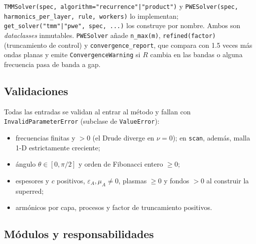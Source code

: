 \documentclass[11pt,a4paper]{article}
\begin{document}
\texttt{TMMSolver(spec, algorithm="recurrence"|"product")} y
\texttt{PWESolver(spec, harmonics\_per\_layer, rule, workers)} lo implementan;
\texttt{get\_solver("tmm"|"pwe", spec, ...)} los construye por nombre. Ambos
son \emph{dataclasses} inmutables. \texttt{PWESolver} añade
\texttt{n\_max(m)}, \texttt{refined(factor)} (truncamiento de control) y
\texttt{convergence\_report}, que compara con 1.5 veces más ondas planas y
emite \texttt{ConvergenceWarning} si \(R\) cambia en las bandas o alguna
frecuencia pasa de banda a gap.

\subsection{Validaciones}

Todas las entradas se validan al entrar al método y fallan con
\texttt{InvalidParameterError} (subclase de \texttt{ValueError}):

\begin{itemize}
\item frecuencias finitas y \(>0\) (el Drude diverge en \(\nu=0\)); en
\texttt{scan}, además, malla 1-D estrictamente creciente;
\item ángulo \(\theta\in[0,\pi/2]\) y orden de Fibonacci entero \(\ge 0\);
\item espesores y \(c\) positivos, \(\varepsilon_A,\mu_A\neq 0\), plasmas
\(\ge 0\) y fondos \(>0\) al construir la superred;
\item armónicos por capa, procesos y factor de truncamiento positivos.
\end{itemize}

\subsection{Módulos y responsabilidades}
\end{document}
